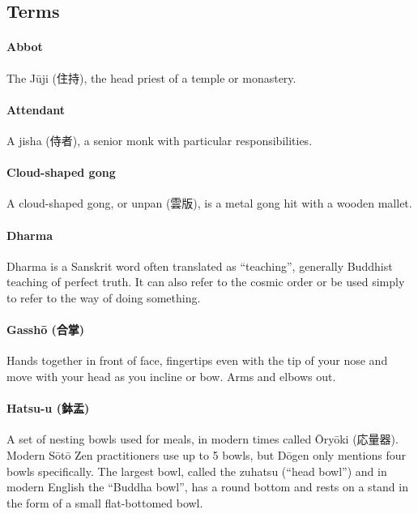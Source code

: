\documentclass{article}
\begin{document}
\clearpage

\begin{multicols}{2}

\section{Terms}

\paragraph{Abbot}

The J\=uji (住持), the head priest of a temple or monastery.

\paragraph{Attendant}

A jisha (侍者), a senior monk with particular responsibilities.

\paragraph{Cloud-shaped gong}

A cloud-shaped gong, or unpan (雲版), is a metal gong hit with a wooden mallet.

\paragraph{Dharma}

Dharma is a Sanskrit word often translated as ``teaching'', generally
Buddhist teaching of perfect truth. It can also refer to the cosmic
order or be used simply to refer to the way of doing something.

\paragraph{Gassh\=o (合掌)}

Hands together in front of face, fingertips even with the tip of your nose
and move with your head as you incline or bow. Arms and elbows out.

\paragraph{Hatsu-u (鉢盂)}

A set of nesting bowls used for meals, in modern times called
\=Ory\=oki (応量器). Modern S\=ot\=o Zen practitioners use up to 5 bowls, but
D\=ogen only mentions four bowls specifically.  The largest bowl,
called the zuhatsu (``head bowl'') and in modern English the ``Buddha
bowl'', has a round bottom and rests on a stand in the form of a small
flat-bottomed bowl.


\end{multicols}
\end{document}
